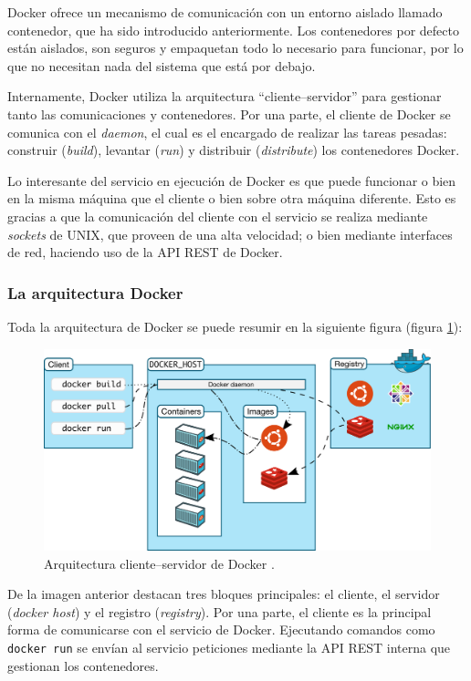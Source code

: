 Docker ofrece un mecanismo de comunicación con un entorno aislado llamado contenedor,
que ha sido introducido anteriormente. Los contenedores por defecto están aislados,
son seguros y empaquetan todo lo necesario para funcionar, por lo que no necesitan
nada del sistema que está por debajo.

Internamente, Docker utiliza la arquitectura ``cliente--servidor'' para gestionar tanto
las comunicaciones y contenedores. Por una parte, el cliente de Docker se comunica
con el \textit{daemon}, el cual es el encargado de realizar las tareas pesadas:
construir (\textit{build}), levantar (\textit{run}) y distribuir (\textit{distribute})
los contenedores Docker.

Lo interesante del servicio en ejecución de Docker es que puede funcionar o bien
en la misma máquina que el cliente o bien sobre otra máquina diferente. Esto es
gracias a que la comunicación del cliente con el servicio se realiza mediante
\textit{sockets} de UNIX, que proveen de una alta velocidad; o bien mediante
interfaces de red, haciendo uso de la API REST de Docker.

\subsubsection*{La arquitectura Docker}

Toda la arquitectura de Docker se puede resumir en la siguiente figura (figura \ref{fig:docker-arch}):

\begin{figure}[H]
    \centering
    \includegraphics[width=\linewidth]{pictures/docker-arch.png}
    \caption{Arquitectura cliente--servidor de Docker \cite{DockerOverview2021}.}
    \label{fig:docker-arch}
\end{figure}

De la imagen anterior destacan tres bloques principales: el cliente, el servidor
(\textit{docker host}) y el registro (\textit{registry}). Por una parte, el cliente
es la principal forma de comunicarse con el servicio de Docker. Ejecutando comandos
como \texttt{docker run} se envían al servicio peticiones mediante la API REST interna
que gestionan los contenedores.


